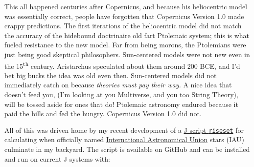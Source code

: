 This all happened centuries after Copernicus, and because his
heliocentric model was essentially correct, people have forgotten that
Copernicus Version 1.0 made crappy predictions. The first iterations of
the heliocentric model did not match the accuracy of the hidebound
doctrinaire old fart Ptolemaic system; this is what fueled resistance
to the new model. Far from being morons, the Ptolemians were just being
good skeptical philosophers. Sun-centered models were not new even in
the 15\textsuperscript{th} century. Aristarchus speculated about them
around 200 BCE, and I'd bet big bucks the idea was old even then.
Sun-centered models did not immediately catch on because \emph{theories must
pay their way.} A nice idea that doesn't feed you, (I'm looking at you
Multiverse, and you too String Theory), will be tossed aside for
ones that do! Ptolemaic astronomy endured because it paid the bills and
fed the hungry. Copernicus Version 1.0 did not.

All of this was driven home by my recent development of a
\href{https://github.com/bakerjd99/jackshacks/blob/main/riseset.ijs}{J
script \texttt{riseset}} for calculating when officially named
\href{https://www.iau.org/}{International Astronomical Union} stars
(IAU) culminate in my backyard. The script is available on GitHub and
can be installed and run on current J systems with:

\begin{Shaded}
\begin{Highlighting}[]

\end{Highlighting}
\end{Shaded}

